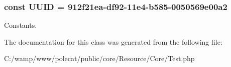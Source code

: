 \subsubsection[{U\+U\+I\+D}]{\setlength{\rightskip}{0pt plus 5cm}const U\+U\+I\+D = \textquotesingle{}912f21ea-\/df92-\/11e4-\/b585-\/0050569e00a2\textquotesingle{}}\label{class_able_polecat___resource___core___test_a74b892c8c0b86bf9d04c5819898c51e7}
Constants. 

The documentation for this class was generated from the following file\+:\begin{DoxyCompactItemize}
\item 
C\+:/wamp/www/polecat/public/core/\+Resource/\+Core/Test.\+php\end{DoxyCompactItemize}
